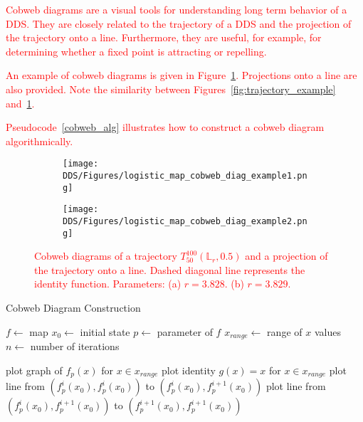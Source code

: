 \label{def:cobweb}
\begin{remark}
    \textcolor{red}{
    Cobweb diagrams are a visual tools for understanding long term behavior of a DDS.
    They are closely related to the trajectory of a DDS and the projection of the trajectory onto a line.
    Furthermore, they are useful, for example, for determining whether a fixed point is attracting or repelling.
    }
    \par
    \textcolor{red}{
    An example of cobweb diagrams is given in Figure~\ref{fig:cobweb_diag_example}.
    Projections onto a line are also provided.
    Note the similarity between Figures~\ref{fig:trajectory_example} and~\ref{fig:cobweb_diag_example}.
    }
    \par
    \textcolor{red}{
    Pseudocode~\ref{cobweb_alg} illustrates how to construct a cobweb diagram algorithmically.
    }
\end{remark}

\begin{figure}[!h]
    \centering
    \begin{subfigure}{0.6\textwidth}
        \centering
        \texttt{[image: DDS/Figures/logistic\_map\_cobweb\_diag\_example1.png]}
        \caption{}
    \end{subfigure}
    \hfill
    \begin{subfigure}{0.6\textwidth}
        \centering
        \texttt{[image: DDS/Figures/logistic\_map\_cobweb\_diag\_example2.png]}
        \caption{}
    \end{subfigure}

    \caption{
        \textcolor{red}{
        Cobweb diagrams of a trajectory $T_{50}^{100}(\mathbb{L}_{r}, 0.5)$ and a projection of the trajectory onto a line. 
        Dashed diagonal line represents the identity function. 
        Parameters: 
        (a) $r = 3.828$. 
        (b) $r = 3.829$. 
        }
        }
    \label{fig:cobweb_diag_example}
\end{figure}


\begin{algorithm}
\caption{Cobweb Diagram Construction}\label{cobweb_alg}
\begin{algorithmic}[1]
\Statex $f \gets$ map
\Statex $x_0 \gets$ initial state
\Statex $p \gets$ parameter of $f$
\Statex $x_{range} \gets$ range of $x$ values
\Statex $n \gets$ number of iterations

\State plot graph of $f_p(x)$ for $x \in x_{range}$
\State plot identity $g(x)=x$ for $x \in x_{range}$
\State plot line from $(f_{p}^{i}(x_0), f_{p}^{i}(x_0))$ to $(f_{p}^{i}(x_0), f_{p}^{i+1}(x_0))$
\State plot line from $(f_{p}^{i}(x_0), f_{p}^{i+1}(x_0))$ to $(f_{p}^{i+1}(x_0), f_{p}^{i+1}(x_0))$
\EndFor

\end{algorithmic}
\end{algorithm}


